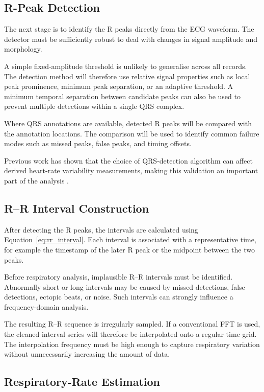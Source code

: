 \subsection{R-Peak Detection}
\label{subsec:r_peak}

The next stage is to identify the R peaks directly from the ECG waveform.
The detector must be sufficiently robust to deal with changes in signal
amplitude and morphology.

A simple fixed-amplitude threshold is unlikely to generalise across all
records. The detection method will therefore use relative signal properties
such as local peak prominence, minimum peak separation, or an adaptive
threshold. A minimum temporal separation between candidate peaks can also be
used to prevent multiple detections within a single QRS complex.

Where QRS annotations are available, detected R peaks will be compared with
the annotation locations. The comparison will be used to identify common
failure modes such as missed peaks, false peaks, and timing offsets.

Previous work has shown that the choice of QRS-detection algorithm can affect
derived heart-rate variability measurements, making this validation an
important part of the analysis \cite{weinstein2026}.


\subsection{R--R Interval Construction}
\label{subsec:rr}

After detecting the R peaks, the intervals are calculated using
Equation~\ref{eq:rr_interval}. Each interval is associated with a
representative time, for example the timestamp of the later R peak or the
midpoint between the two peaks.

Before respiratory analysis, implausible R--R intervals must be identified.
Abnormally short or long intervals may be caused by missed detections, false
detections, ectopic beats, or noise. Such intervals can strongly influence a
frequency-domain analysis.

The resulting R--R sequence is irregularly sampled. If a conventional FFT is
used, the cleaned interval series will therefore be interpolated onto a
regular time grid. The interpolation frequency must be high enough to capture
respiratory variation without unnecessarily increasing the amount of data.


\subsection{Respiratory-Rate Estimation}
\label{subsec:resp_estimation}

